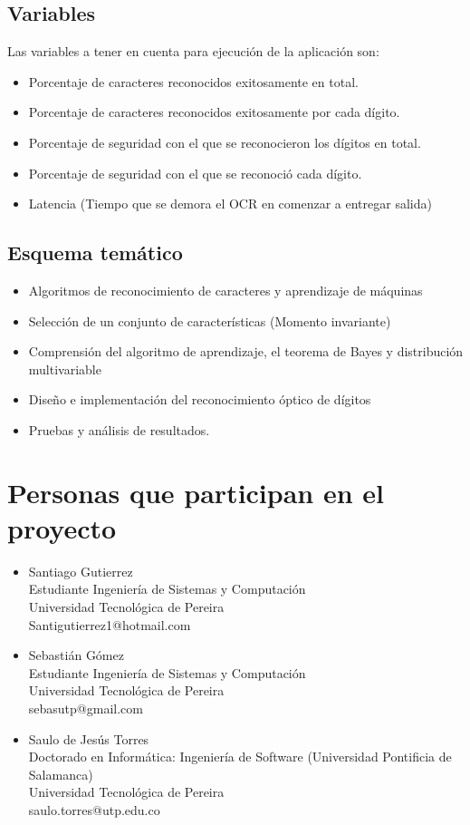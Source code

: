 \documentclass[a4paper, 11pt, oneside]{article}
\begin{document}
	\subsection{Variables}
	Las variables a tener en cuenta para ejecución de la aplicación son:
	\begin{itemize}
	\item Porcentaje de caracteres reconocidos exitosamente en total.
	\item Porcentaje de caracteres reconocidos exitosamente por cada dígito.
	\item Porcentaje de seguridad con el que se reconocieron los dígitos en total.
	\item Porcentaje de seguridad con el que se reconoció cada dígito.
	\item Latencia (Tiempo que se demora el OCR en comenzar a entregar salida)
	\end{itemize}
		
	\subsection{Esquema temático}
	\begin{itemize}
		\item Algoritmos de reconocimiento de caracteres y aprendizaje de máquinas
		\item Selección de un conjunto de características (Momento invariante)
		\item Comprensión del algoritmo de aprendizaje, el teorema de Bayes y distribución multivariable
		\item Diseño e implementación del reconocimiento óptico de dígitos
		\item Pruebas y análisis de resultados.
	\end{itemize}
	\clearpage
	
	\section{Personas que participan en el proyecto}
	\begin{itemize}
   \item Santiago Gutierrez\\
Estudiante Ingeniería de Sistemas y Computación\\
Universidad Tecnológica de Pereira\\
Santigutierrez1@hotmail.com
   \item Sebastián Gómez\\
Estudiante Ingeniería de Sistemas y Computación\\
Universidad Tecnológica de Pereira\\
sebasutp@gmail.com
   \item Saulo de Jesús Torres\\
Doctorado en Informática: Ingeniería de Software (Universidad Pontificia de Salamanca)\\
Universidad Tecnológica de Pereira\\
saulo.torres@utp.edu.co
	\end{itemize}
	\clearpage
	
\end{document}
